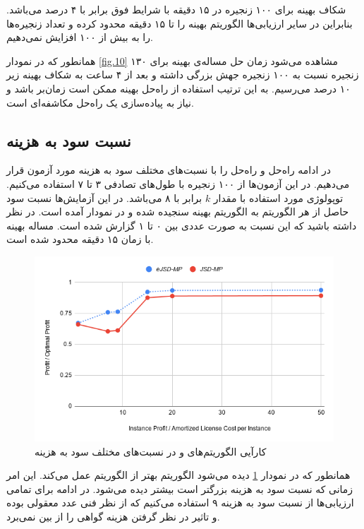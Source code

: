 شکاف بهینه برای ۱۰۰ زنجیره در ۱۵ دقیقه با شرایط فوق برابر با ۴ درصد می‌باشد. بنابراین
در سایر ارزیابی‌ها الگوریتم بهینه را تا ۱۵ دقیقه محدود کرده و تعداد زنجیره‌ها را به بیش از ۱۰۰ افزایش نمی‌دهیم.

همانطور که در نمودار \ref{fig.10} مشاهده می‌شود زمان حل مساله‌ی بهینه برای ۱۳۰ زنجیره نسبت به ۱۰۰ زنجیره جهش بزرگی داشته
و بعد از ۴ ساعت به شکاف بهینه زیر ۱۰ درصد می‌رسیم.
به این ترتیب استفاده از راه‌حل بهینه ممکن است زمان‌بر باشد و نیاز به پیاده‌سازی یک راه‌حل مکاشفه‌ای است.

\subsection{نسبت سود به هزینه}

در ادامه راه‌حل  و راه‌حل  را با نسبت‌های مختلف سود به هزینه مورد آزمون قرار می‌دهیم. 
در این آزمون‌ها از ۱۰۰ زنجیره با طول‌های تصادفی ۳ تا ۷ استفاده می‌کنیم.
توپولوژی مورد استفاده
با مقدار \(k\)
برابر با ۸
می‌باشد.
در این آزمایش‌ها نسبت سود حاصل از هر الگوریتم به الگوریتم بهینه سنجیده شده و در نمودار آمده است.
در نظر داشته باشید که این نسبت به صورت عددی بین ۰ تا ۱ گزارش شده است.
مساله بهینه با زمان ۱۵ دقیقه محدود شده است.


\begin{figure}[h]
\center\includegraphics[scale=.7]{images/chart-1}
\caption{کارآیی الگوریتم‌های  و  در نسبت‌های مختلف سود به هزینه}
\label{fig.4}
\end{figure}

همانطور که در نمودار \ref{fig.4} دیده می‌شود الگوریتم  بهتر از الگوریتم  عمل می‌کند.
این امر زمانی که نسبت سود به هزینه بزرگتر است بیشتر دیده می‌شود.
در ادامه برای تمامی ارزیابی‌ها از نسبت سود به هزینه ۹ استفاده می‌کنیم که از نظر فنی عدد معقولی بوده و تاثیر در نظر گرفتن هزینه گواهی را از بین نمی‌برد.

